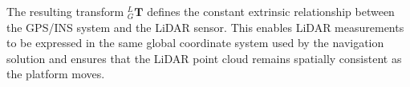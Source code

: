 \documentclass{erauthesis}
\begin{document}




The resulting transform ${}_{G}^{L}\mathbf{T}$ defines the constant extrinsic relationship between the GPS/INS system and the LiDAR sensor. This enables LiDAR measurements to be expressed in the same global coordinate system used by the navigation solution and ensures that the LiDAR point cloud remains spatially consistent as the platform moves.
\end{document}
